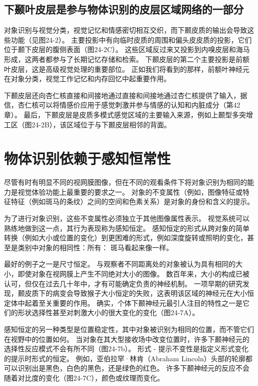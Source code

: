 \subsection{下颞叶皮层是参与物体识别的皮层区域网络的一部分}

对象识别与视觉分类，视觉记忆和情感密切相互交织，而下颞皮质的输出会导致这些功能（见图24-2）。 主要投影中有向临时皮质的周围和偏头皮皮质的投影，它们位于颞下皮层的腹侧表面（图24-2C）。 这些区域反过来又投影到内嗅皮层和海马形成，这两者都参与了长期记忆存储和检索。 下颞皮层的第二个主要投影是前额叶皮层，这是高级视觉处理的重要部位。 正如我们将看到的那样，前额叶神经元在对象分类，视觉工作记忆和内存回忆中起重要作用。

下颞皮层还向杏仁核直接和间接地通过直接和间接地通过杏仁核提供了输入，据信，杏仁核可以将情感价应用于感觉刺激并参与情感的认知和内脏成分（第42章）。 最后，下颞皮层是皮质多模式感觉区域的主要输入来源，例如上颞型多突增工区（图24-2B），该区域位于与下颞皮层相邻的背面。

\section{物体识别依赖于感知恒常性}

尽管有时有明显不同的视网膜图像，但在不同的观看条件下将对象识别为相同的能力是视觉体验功能上最重要的要求之一。 对象的不变属性（例如，图像特征或特征特征（例如斑马的条纹）之间的空间和色素关系）是对象的身份和含义的提示。

为了进行对象识别，这些不变属性必须独立于其他图像属性表示。 视觉系统可以熟练地做到这一点，其行为表现称为感知恒定。 感知恒定的形式从跨对象的简单转换（例如大小或位置的变化）到更困难的形式，例如深度旋转或照明的变化，甚至是类别中对象的相同性：所有： 斑马看起来像一样。

最好的例子之一是尺寸恒定。 与观察者不同距离处的对象被认为具有相同的大小，即使对象在视网膜上产生不同绝对大小的图像。 数百年来，大小的构成已被认可，但仅在过去几十年中，才有可能确定负责的神经机制。 一项早期的研究发现，颞皮质下的病变会导致猴子大小恒定的失败，这表明该区域的神经元在大小恒定体中起着至关重要的作用。 确实，个体下颞神经元最引人注目的特性之一是它们的形状选择性甚至对刺激大小的很大变化的变化（图24-7A）。

感知恒定的另一种类型是位置稳定性，其中对象被识别为相同的位置，而不管它们在视野中的位置如何。 当对象在其大型接收场中改变位置时，许多下颞神经元的选择性反应模式不会有所不同（图24-7b）。 形式 - 提示不变性是指定义形式变化的提示时形式的恒定。 例如，亚伯拉罕·林肯（Abraham Lincoln）头部的轮廓都可以识别出是黑色，白色的黑色，还是绿色的红色。 许多下颞神经元的反应不会随着对比度的变化（图24-7C），颜色或纹理而变化。

